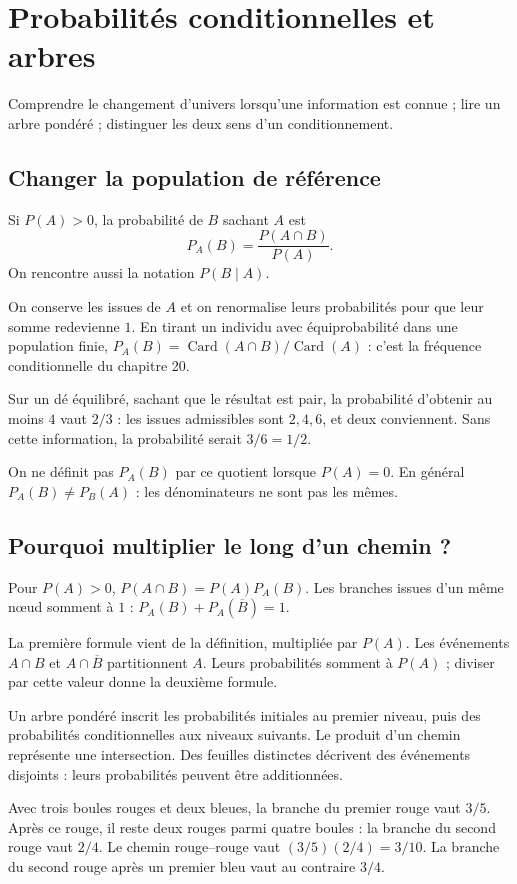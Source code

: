 \documentclass[../cours_2de.tex]{subfiles}
\begin{document}
\setcounter{chapter}{21}
\chapter{Probabilités conditionnelles et arbres}
\label{sec:ch22}
\begin{objectif}
Comprendre le changement d'univers lorsqu'une information est connue ; lire un arbre pondéré ; distinguer les deux sens d'un conditionnement.
\end{objectif}
\section{Changer la population de référence}
\begin{definition}
Si $P(A)>0$, la probabilité de $B$ sachant $A$ est
\[
P_A(B)=\frac{P(A\cap B)}{P(A)}.
\]
On rencontre aussi la notation $P(B\mid A)$.
\end{definition}
On conserve les issues de $A$ et on renormalise leurs probabilités pour que leur somme redevienne $1$.
En tirant un individu avec équiprobabilité dans une population finie,
$P_A(B)=\operatorname{Card}(A\cap B)/\operatorname{Card}(A)$ :
c'est la fréquence conditionnelle du chapitre 20.
\begin{exemple}
Sur un dé équilibré, sachant que le résultat est pair, la probabilité d'obtenir au moins $4$ vaut $2/3$ : les issues admissibles sont $2,4,6$, et deux conviennent.
Sans cette information, la probabilité serait $3/6=1/2$.
\end{exemple}
\begin{attention}
On ne définit pas $P_A(B)$ par ce quotient lorsque $P(A)=0$.
En général $P_A(B)\ne P_B(A)$ : les dénominateurs ne sont pas les mêmes.
\end{attention}
\section{Pourquoi multiplier le long d'un chemin ?}
\begin{propriete}
Pour $P(A)>0$, $P(A\cap B)=P(A)P_A(B)$.
Les branches issues d'un même nœud somment à $1$ :
$P_A(B)+P_A(\overline B)=1$.
\end{propriete}
\begin{demonstration}
La première formule vient de la définition, multipliée par $P(A)$.
Les événements $A\cap B$ et $A\cap\overline B$ partitionnent $A$.
Leurs probabilités somment à $P(A)$ ; diviser par cette valeur donne la deuxième formule.
\end{demonstration}
Un arbre pondéré inscrit les probabilités initiales au premier niveau, puis des probabilités conditionnelles aux niveaux suivants.
Le produit d'un chemin représente une intersection. Des feuilles distinctes décrivent des événements disjoints : leurs probabilités peuvent être additionnées.
\begin{exemple}
Avec trois boules rouges et deux bleues, la branche du premier rouge vaut $3/5$.
Après ce rouge, il reste deux rouges parmi quatre boules : la branche du second rouge vaut $2/4$.
Le chemin rouge--rouge vaut $(3/5)(2/4)=3/10$.
La branche du second rouge après un premier bleu vaut au contraire $3/4$.
\end{exemple}
\end{document}
